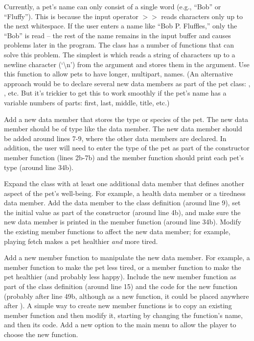 Currently, a pet's name can only consist of a single word (e.g., ``Bob'' or ``Fluffy'').  This is because the input operator $>>$ reads characters only up to the next whitespace.  If the user enters a name like ``Bob P. Fluffles,'' only the ``Bob'' is read -- the rest of the name remains in the input buffer and causes problems later in the program.  The  class has a number of functions that can solve this problem.  The simplest is  which reads a string of characters up to a newline character (`\textbackslash n') from the  argument and stores them in the  argument.  Use this function to allow pets to have longer, multipart, names.  (An alternative approach would be to declare several new data members as part of the pet class: , , etc.  But it's trickier to get this to work smoothly if the pet's name has a variable numbers of parts: first, last, middle, title, etc.)


Add a new data member that stores the type or species of the pet.   The new data member should be of type  like the  data member.  The new data member should be added around lines 7-9, where the other data members are declared.  In addition, the user will need to enter the type of the pet as part of the constructor member function (lines 2b-7b) and the  member function should print each pet's type (around line 34b).


Expand the  class with at least one additional data member that defines another aspect of the pet's well-being.  For example,  a health data member or a tiredness data member.  Add the data member to the class definition (around line 9), set the initial value as part of the constructor (around line 4b), and make sure the new data member is printed in the  member function (around line 34b).  Modify the existing member functions to affect the new data member; for example, playing fetch makes a pet healthier \emph{and} more tired.

Add a new member function to manipulate the new data member.  For example, a  member function to make the pet less tired, or a  member function to make the pet healthier (and probably less happy).  Include the new member function as part of the class definition (around line 15) and the code for the new function (probably after line 49b, although as a new function, it could be placed anywhere after ).  A simple way to create new member functions is to copy an existing member function and then modify it, starting by changing the function's name, and then its code.  Add a new option to the main menu to allow the player to choose the new function.

